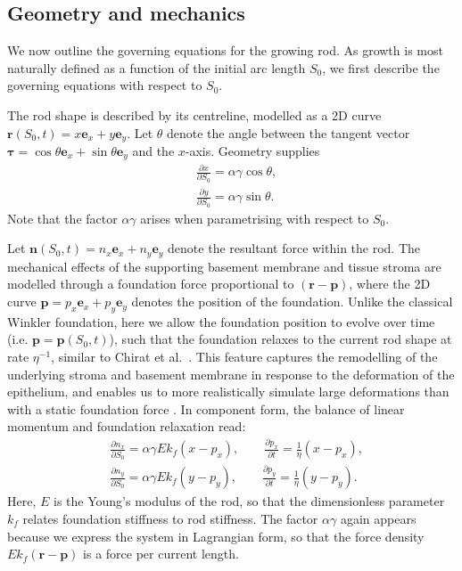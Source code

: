 \subsection{Geometry and mechanics}
We now outline the governing equations for the growing rod. As growth is most naturally defined as a function of the initial arc length $S_0$, we first describe the governing equations with respect to $S_0$. 

The rod shape is described by its centreline, modelled as a 2D curve $\mathbf{r}(S_0, t) = x\mathbf{e}_x + y\mathbf{e}_y$. Let $\theta$ denote the angle between the tangent vector $\boldsymbol{\tau}=\cos\theta\mathbf{e}_x + \sin\theta\mathbf{e}_y$ and the $x$-axis. Geometry supplies
\begin{align}
&\frac{\partial x}{\partial S_0} = \alpha\gamma\cos\theta,\label{eq:dim2Dx}\\
&\frac{\partial y}{\partial S_0} = \alpha\gamma\sin\theta.\label{eq:dim2Dy}
\end{align}
Note that the factor $\alpha\gamma$ arises when parametrising with respect to $S_0$. 

 Let $\mathbf{n}(S_0, t) = n_x\mathbf{e}_x + n_y\mathbf{e}_y$ denote the resultant force within the rod. The mechanical effects of the supporting basement membrane and tissue stroma are modelled through a foundation force proportional to $(\mathbf{r}-\mathbf{p})$, where the 2D curve $\mathbf{p} = p_x\mathbf{e}_x + p_y\mathbf{e}_y$ denotes the position of the foundation. Unlike the classical Winkler foundation, here we allow the foundation position to evolve over time (i.e. $\mathbf{p}=\mathbf{p}(S_0,t)$), such that the foundation relaxes to the current rod shape at rate $\eta^{-1}$, similar to Chirat et al.\ \cite{Chirat2013}. This feature captures the remodelling of the underlying stroma and basement membrane in response to the deformation of the epithelium, and enables us to more realistically simulate large deformations than with a static foundation force \cite{Almet2019b}. In component form, the balance of linear momentum and foundation relaxation read:
\begin{align}
&\frac{\partial n_x}{\partial S_0} = \alpha\gamma Ek_f(x - p_x), \qquad \frac{\partial p_x}{\partial t}= \frac{1}{\eta}(x - p_x),\label{eq:dim2Dforcex}\\
&\frac{\partial n_y}{\partial S_0} = \alpha\gamma Ek_f(y - p_y), \qquad \frac{\partial p_y}{\partial t} = \frac{1}{\eta}(y - p_y).\label{eq:dim2Dforcey}
\end{align}
Here, $E$ is the Young's modulus of the rod, so that the dimensionless parameter $k_f$ relates foundation stiffness to rod stiffness. The factor $\alpha\gamma$ again appears because we express the system in Lagrangian form, so that the force density $Ek_f(\mathbf{r}-\mathbf{p})$ is  a force per current length.

